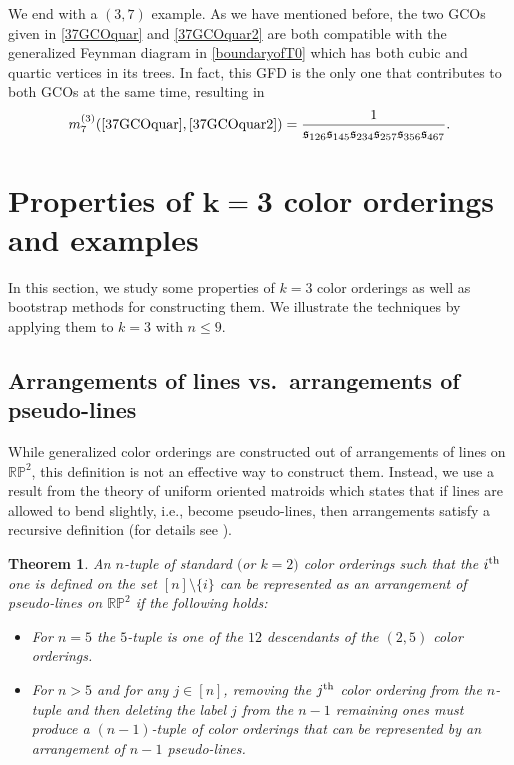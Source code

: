 \documentclass[pdftex]{sigma}
\def \s {\sigma}
\newtheorem{thm}{Theorem}[section]
\theoremstyle{definition}
\def \s {\mathfrak{s}}
\numberwithin{equation}{section}
\begin{document}
We end with a $(3,7)$ example. As we have mentioned before, the two GCOs given in \eqref{37GCOquar} and \eqref{37GCOquar2} are both compatible with the generalized Feynman diagram in \eqref{boundaryofT0} which has both cubic and quartic vertices in its trees. In fact, this GFD is the only one that contributes to both GCOs at the same time, resulting in
\begin{equation*}
 m_{7}^{(3)}( \eqref{37GCOquar},\eqref{37GCOquar2}) = \frac{1}{\s_{126} \s_{145} \s_{234} \s_{257} \s_{356} \s_{467}}.
\end{equation*}

\section[Properties of k=3 color orderings and examples]{Properties of $\boldsymbol{k=3}$ color orderings and examples}\label{sec6}

In this section, we study some properties of $k=3$ color orderings as well as bootstrap methods for constructing them. We illustrate the techniques by applying them to $k=3$ with $n\leq 9$.

\subsection[Arrangements of lines vs. arrangements of pseudo-lines]{Arrangements of lines vs.\ arrangements of pseudo-lines}\label{colorrecursion}

While generalized color orderings are constructed out of arrangements of lines on $\mathbb{RP}^2$, this definition is not an effective way to construct them. Instead, we use a result from the theory of uniform oriented matroids which states that if lines are allowed to bend slightly, i.e., become pseudo-lines, then arrangements satisfy a recursive definition (for details see \cite[Chapter 6]{bjorner1999oriented}).

\begin{thm}\label{pseudoLines}
 An $n$-tuple of standard $($or $k=2)$ color orderings such that the $i^{\rm th}$ one is defined on the set $[n]\setminus \{i\}$ can be represented as an arrangement of pseudo-lines on $\mathbb{RP}^2$ if the following holds:
 \begin{itemize}\itemsep=0pt
 \item For $n=5$ the $5$-tuple is one of the $12$ descendants of the $(2,5)$ color orderings.
\item For $n>5$ and for any $j\in [n]$, removing the $j^{\rm th}$ color ordering from the $n$-tuple and then deleting the label $j$ from the $n-1$ remaining ones must produce a $(n-1)$-tuple of color orderings that can be represented by an arrangement of $n-1$ pseudo-lines.
 \end{itemize}
\end{thm}
\end{document}
